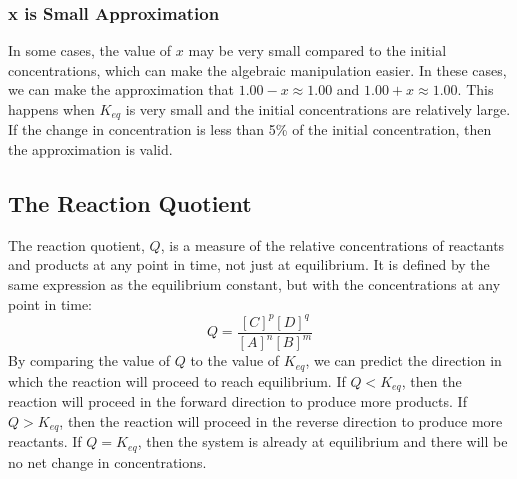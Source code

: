 \subsubsection{x is Small Approximation}
In some cases, the value of $x$ may be very small compared to the initial concentrations, which can make the algebraic manipulation easier. In these cases, we can make the approximation that $1.00 - x \approx 1.00$ and $1.00 + x \approx 1.00$. This happens when $K_{eq}$ is very small and the initial concentrations are relatively large. If the change in concentration is less than 5\% of the initial concentration, then the approximation is valid. 
\subsection{The Reaction Quotient}
The reaction quotient, $Q$, is a measure of the relative concentrations of reactants and products at any point in time, not just at equilibrium. It is defined by the same expression as the equilibrium constant, but with the concentrations at any point in time:
\begin{equation}\label{eq:Q}
    Q = \frac{[C]^p[D]^q}{[A]^n[B]^m}
\end{equation}
By comparing the value of $Q$ to the value of $K_{eq}$, we can predict the direction in which the reaction will proceed to reach equilibrium. If $Q < K_{eq}$, then the reaction will proceed in the forward direction to produce more products. If $Q > K_{eq}$, then the reaction will proceed in the reverse direction to produce more reactants. If $Q = K_{eq}$, then the system is already at equilibrium and there will be no net change in concentrations.